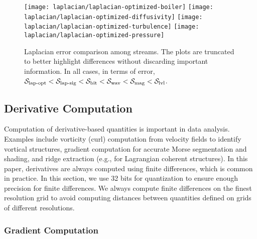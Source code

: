 \begin{figure*}[!t]
\centering
{}
{\texttt{[image: laplacian/laplacian-optimized-boiler]}\vspace{-0.5em}}
{\texttt{[image: laplacian/laplacian-optimized-diffusivity]}\vspace{-0.5em}}
{\texttt{[image: laplacian/laplacian-optimized-turbulence]}\vspace{-0.5em}}
{\texttt{[image: laplacian/laplacian-optimized-pressure]}\vspace{-0.5em}}
\vspace{-0.5em}
\caption{Laplacian error comparison among streams. The plots are truncated to better highlight
differences without discarding important information. In all cases, in terms of error, $\slop <
\slsg < \sbit < \swav < \smag < \slvl$.}
\label{fig:laplacian-error-comparison}
\vspace{-1.5em}
\end{figure*}

\subsection{Derivative Computation} \label{sec:derivatives}

Computation of derivative-based quantities is important in data analysis. Examples include vorticity
(curl) computation from velocity fields to identify vortical structures, gradient computation for
accurate Morse segmentation and shading, and ridge extraction (e.g., for Lagrangian coherent
structures). In this paper, derivatives are always computed using finite differences, which is
common in practice. In this section, we use 32 bits for quantization to ensure enough precision for
finite differences. We always compute finite differences on the finest resolution grid to avoid
computing distances between quantities defined on grids of different resolutions.

\subsubsection{Gradient Computation} \label{sec:gradient}

